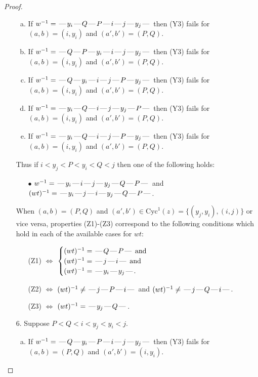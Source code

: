 \documentclass[10pt]{article}
\theoremstyle{definition}
\theoremstyle{definition}
\def\dash{\text{\hspace{0.5mm}---\hspace{0.5mm}}}
\def\Cyc{\mathrm{Cyc}}
\begin{document}
\begin{proof}
\begin{enumerate}
\begin{enumerate}[(a)]
\item If $w^{-1} = \dash y_i\dash Q\dash P\dash i\dash j\dash y_j\dash $ then (Y3) fails for $(a,b)=(i,y_i)$ and $(a',b')=(P,Q)$.
\item If $w^{-1} = \dash Q\dash P\dash y_i\dash i\dash j\dash y_j\dash $ then (Y3) fails for $(a,b)=(i,y_i)$ and $(a',b')=(P,Q)$.
\item If $w^{-1} = \dash Q\dash y_i\dash i\dash j\dash P\dash y_j\dash $ then (Y3) fails for $(a,b)=(i,y_i)$ and $(a',b')=(P,Q)$.
\item If $w^{-1} = \dash y_i\dash Q\dash i\dash j\dash y_j\dash P\dash $ then (Y3) fails for $(a,b)=(i,y_i)$ and $(a',b')=(P,Q)$.
\item If $w^{-1} = \dash y_i\dash Q\dash i\dash j\dash P\dash y_j\dash $ then (Y3) fails for $(a,b)=(i,y_i)$ and $(a',b')=(P,Q)$.
\end{enumerate}
Thus if $i < y_j < P < y_i < Q < j$ then one of the following holds:
\begin{enumerate}
\item[$\bullet$] $w^{-1} = \dash y_i\dash i\dash j\dash y_j\dash Q\dash P\dash $ and $(wt)^{-1} = \dash y_i\dash j\dash i\dash y_j\dash Q\dash P\dash $.
\end{enumerate}
When $(a,b)= (P,Q)$ and $(a',b')\in \Cyc^1(z)=\{(y_j,y_i),(i,j)\}$ or vice versa,
properties (Z1)-(Z3) correspond to the following conditions which
hold in each of the available cases for $wt$:
\begin{enumerate}
\item[](Z1) $\Leftrightarrow$ $\begin{cases}\text{$(wt)^{-1} = \dash Q \dash P \dash$}\text{ and }\\
\text{$(wt)^{-1} = \dash j \dash i \dash$}\text{ and }\\
\text{$(wt)^{-1} = \dash y_i \dash y_j \dash$}.\end{cases}$
\item[](Z2) $\Leftrightarrow$ $(wt)^{-1} \neq \dash j \dash P \dash i \dash$ and $(wt)^{-1}\neq \dash j \dash Q \dash i \dash$.
\item[](Z3) $\Leftrightarrow$ $(wt)^{-1} = \dash y_j \dash Q \dash$.
\end{enumerate}
\item[$6$.] Suppose $P < Q < i < y_j < y_i < j$.
\begin{enumerate}[(a)]
\item If $w^{-1} = \dash Q\dash y_i\dash P\dash i\dash j\dash y_j\dash $ then (Y3) fails for $(a,b)=(P,Q)$ and $(a',b')=(i,y_i)$.

\end{enumerate}
\end{enumerate}
\end{proof}
\end{document}
